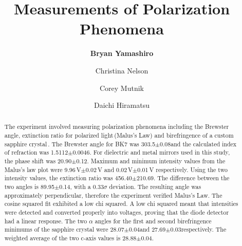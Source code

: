 \documentclass[aps,prl,twocolumn,superscriptaddress,nofootinbib]{revtex4-1}
\begin{document}





\title{Measurements of Polarization Phenomena}


\author{\textbf{Bryan Yamashiro}}
\author{Christina Nelson}
\author{Corey Mutnik}
\author{Daichi Hiramatsu}






\begin{abstract}

The experiment involved measuring polarization phenomena including the Brewster angle, extinction ratio for polarized light\,(Malus's Law) and birefringence of a custom sapphire crystal\,\cite{1}. The Brewster angle for BK7 was 303.5\degree$\pm$0.08\degree and the calculated index of refraction was 1.5112$\pm$0.0046. For dielectric and metal mirrors used in this study, the phase shift was 20.90\degree$\pm$0.12\degree. Maximum and minimum intensity values from the Malus's law plot were 9.96\,V$\pm$0.02\,V and 0.02\,V$\pm$0.01\,V respectively. Using the two intensity values, the extinction ratio was 456.40$\pm$210.69. The difference between the two angles is 89.95\degree$\pm$0.14\degree, with a 0.33$\sigma$ deviation. The resulting angle was approximately perpendicular, therefore the experiment verified Malus's Law. The cosine squared fit exhibited a low chi squared. A low chi squared meant that intensities were detected and converted properly into voltages, proving that the diode detector had a linear response. The two $\alpha$ angles for the first and second birefringence minimums of the sapphire crystal were 28.07\degree$\pm$0.04\degree and 27.69\degree$\pm$0.03\degree respectively. The weighted average of the two c-axis values is 28.88\degree$\pm$0.04\degree.

\end{abstract}
\end{document}

